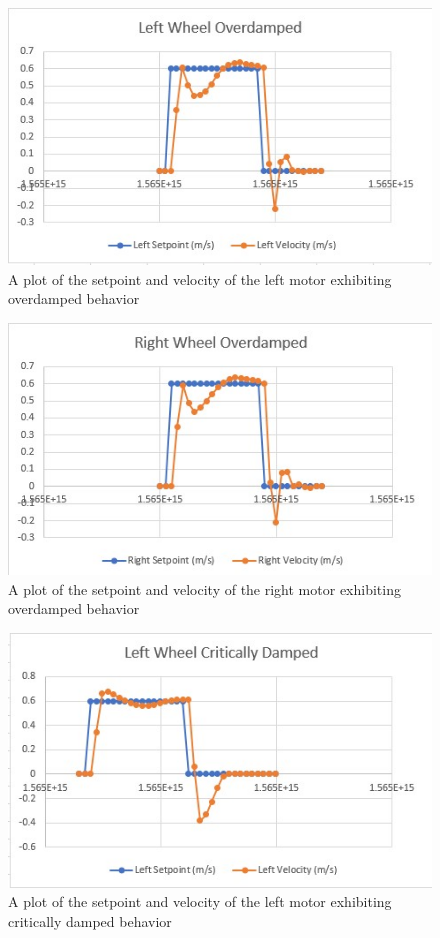 \documentclass[conference]{IEEEtran}
\begin{document}
\begin{figure}
	\includegraphics[width=\linewidth]{lo.jpg}
	\caption{A plot of the setpoint and velocity of the left motor exhibiting overdamped behavior}
	\label{fig:lo}
\end{figure}

\begin{figure}
	\includegraphics[width=\linewidth]{ro.jpg}
	\caption{A plot of the setpoint and velocity of the right motor exhibiting overdamped behavior}
	\label{fig:ro}
\end{figure}

\begin{figure}
	\includegraphics[width=\linewidth]{lc.jpg}
	\caption{A plot of the setpoint and velocity of the left motor exhibiting critically damped behavior}
	\label{fig:lc}
\end{figure}
\end{document}
